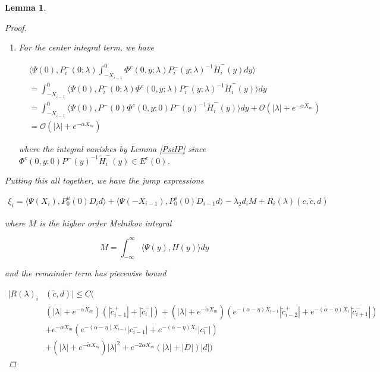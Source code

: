\documentclass[12pt]{article}
\newtheorem{lemma}{Lemma}
\begin{document}
\begin{lemma}
\begin{proof}
\begin{enumerate}
where we absorbed the $e^{-(\alpha - 2 \eta) X_i}|c_i^-|$ term into the lower order term $|\tilde{c}_i^-|$.

\item For the center integral term, we have

\begin{align*}
&\langle \Psi(0), P_i^-(0; \lambda)
\int_{-X_{i-1}}^0 \Phi^c(0, y; \lambda) P_i^-(y; \lambda)^{-1} \tilde{H}_i^-(y) dy \rangle \\
&= \int_{-X_{i-1}}^0 \langle \Psi(0), P_i^-(0; \lambda) \Phi^c(0, y; \lambda) P_i^-(y; \lambda)^{-1} \tilde{H}_i^-(y) \rangle dy \\
&= \int_{-X_{i-1}}^0 \langle \Psi(0), P^-(0) \Phi^c(0, y; 0) P^-(y)^{-1} \tilde{H}_i^-(y) \rangle dy + \mathcal{O}(|\lambda| + e^{-\alpha X_m}) \\
&= \mathcal{O}(|\lambda| + e^{-\alpha X_m})
\end{align*}

where the integral vanishes by Lemma \ref{PsiIP} since $\Phi^c(0, y; 0) P^-(y)^{-1} \tilde{H}_i^-(y) \in E^c(0)$.

\end{enumerate}

Putting this all together, we have the jump expressions

\begin{align*}
\xi_i = \langle \Psi(X_i), P_0^u(0) D_i d \rangle
+ \langle \Psi(-X_{i-1}), P_0^s(0) D_{i-1} d \rangle 
- \lambda_2 d_i M + R_i(\lambda)(c, \tilde{c}, d)
\end{align*}

where $M$ is the higher order Melnikov integral

\[
M = \int_{-\infty}^\infty \langle \Psi(y), H(y) \rangle dy 
\]

and the remainder term has piecewise bound

\begin{align*}
|R(\lambda)_i&(\tilde{c}, d)| \leq C \Big( \\
&(|\lambda| + e^{-\alpha X_m})(|\tilde{c}_{i-1}^+| + |\tilde{c}_{i}^-|) + (|\lambda| + e^{-\tilde{\alpha} X_m})( e^{-(\alpha - \eta) X_{i-1}}|\tilde{c}_{i-2}^+| + e^{-(\alpha - \eta) X_i}|\tilde{c}_{i+1}^-|)  \\
&+ e^{-\alpha X_m}( e^{-(\alpha - \eta) X_{i-1}} |c_{i-1}^-| + e^{-(\alpha - \eta) X_i} |c_i^-|) \\
&+ (|\lambda| + e^{-\tilde{\alpha} X_m})|\lambda|^2 + e^{-2 \alpha X_m}(|\lambda| + |D|)|d| \Big)
\end{align*}


\end{proof}
\end{lemma}
\end{document}
